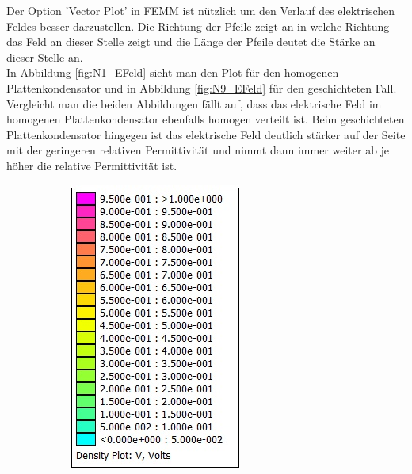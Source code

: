 Der Option 'Vector Plot' in FEMM ist nützlich um den Verlauf des elektrischen Feldes besser darzustellen. Die Richtung der Pfeile zeigt an in welche Richtung das Feld an dieser Stelle zeigt und die Länge der Pfeile deutet die Stärke an dieser Stelle an.\\
In Abbildung \ref{fig:N1_EFeld} sieht man den Plot für den homogenen Plattenkondensator und in Abbildung \ref{fig:N9_EFeld} für den geschichteten Fall. Vergleicht man die beiden Abbildungen fällt auf, dass das elektrische Feld im homogenen Plattenkondensator ebenfalls homogen verteilt ist. Beim geschichteten Plattenkondensator hingegen ist das elektrische Feld deutlich stärker auf der Seite mit der geringeren relativen Permittivität und nimmt dann immer weiter ab je höher die relative Permittivität ist.

\begin{figure}[h]
	\begin{subfigure}[c]{0.2\textwidth}
		\includegraphics[width=\textwidth]{data/KondensatorN9_Legende}

\end{subfigure}
\end{figure}
